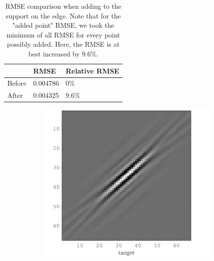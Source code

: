 \begin{table}[!h]\centering
\begin{tabular}{@{}lll@{}}\toprule
 & RMSE & Relative RMSE \\ \midrule
Before & 0.004786 & 0\% \\
After & 0.004325 & 9.6\% \\ \bottomrule
\end{tabular}
\caption{RMSE comparison when adding to the support on the  edge. Note that for the "added point" RMSE, we took the minimum of all RMSE for every point possibly added. Here, the RMSE is at best increased by 9.6\%.}
\end{table}


\begin{figure}[!h]\centering
    \begin{subfigure}[b]{0.49\textwidth}\centering
    \includegraphics[width=\textwidth]{figures/xp/xp_128x128_sc2_angl1_K3_S3_node2_target.png}
    \end{subfigure}
\begin{subfigure}[b]{0.49\textwidth}\centering

\end{subfigure}
\end{figure}

